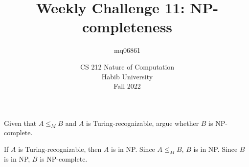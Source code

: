 \documentclass[a4paper]{exam}
\title{Weekly Challenge 11: NP-completeness}
\author{mq06861} %
\date{CS 212 Nature of Computation\\Habib University\\Fall 2022}
\begin{document}
\maketitle

\begin{questions}
  

  Given that $A \leq_M B$ and $A$ is Turing-recognizable, argue whether $B$ is NP-complete.

  \begin{solution}
	If $A$ is Turing-recognizable, then $A$ is in NP. Since $A \leq_M B$, $B$ is in NP. Since $B$ is in NP, $B$ is NP-complete.
  \end{solution}
\end{questions}
\end{document}
